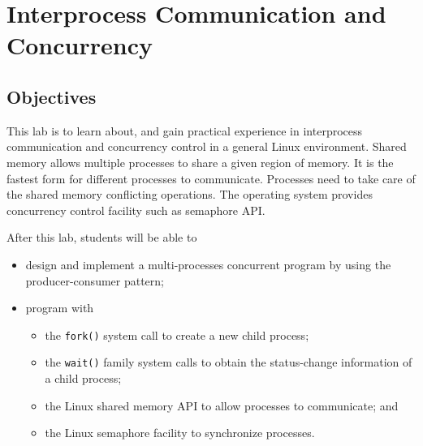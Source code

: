 \chapter{Interprocess Communication and Concurrency}

\section{Objectives}

This lab is to learn about, and gain practical experience in 
interprocess communication and concurrency control in a general Linux environment.
Shared memory allows multiple processes to share a given region of memory. It is the fastest form for different processes to communicate. Processes need to take care of the shared memory conflicting operations.
The operating system provides concurrency control facility such as semaphore API.
 

After this lab, students will be able to
\begin{itemize}
\item design and implement a multi-processes concurrent program by using the producer-consumer pattern;
\item program with
        \begin{itemize}
	\item the \verb+fork()+ system call to create a new child process;
	\item the \verb+wait()+ family system calls to  obtain
	          the status-change information of a child process;
        \item the Linux shared memory API to allow processes to communicate; and
        \item the Linux semaphore facility to synchronize processes.
        \end{itemize}              
\end{itemize}

